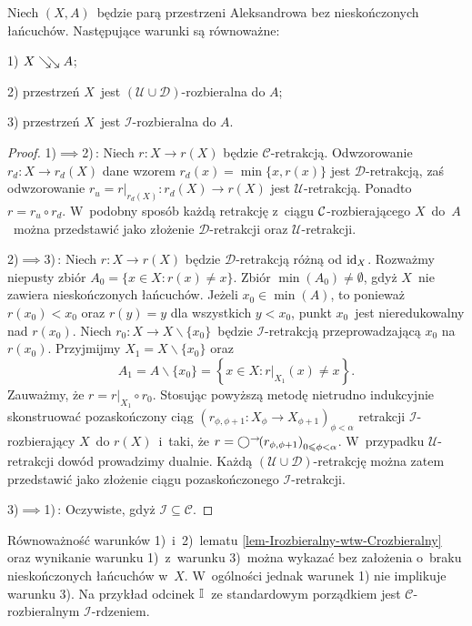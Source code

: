 \begin{lem}\label{lem-Irozbieralny-wtw-Crozbieralny}
Niech $(X,A)$~będzie parą przestrzeni Aleksandrowa bez nieskończonych łańcuchów. Następujące warunki są równoważne:
\begin{compactenum}
\item[1)] $X\searrow\!\!\searrow A$;
\item[2)] przestrzeń $X$~jest $(\mathcal{U}\cup\mathcal{D})$-rozbieralna do $A$;
\item[3)] przestrzeń $X$~jest $\mathcal{I}$-rozbieralna do $A$.
\end{compactenum}
\end{lem}
\begin{proof}
1)$\implies$2)\,: Niech $r\colon X\to r(X)$ będzie $\mathcal{C}$-retrakcją. Odwzorowanie $r_d\colon X\to r_d(X)$ dane wzorem $r_d(x)=\min\{x,r(x)\}$ jest $\mathcal{D}$-retrakcją, zaś odwzorowanie $r_u=r\big|_{r_d(X)}\colon r_d(X)\to r(X)$ jest $\mathcal{U}$-retrakcją. Ponadto $r=r_u\circ r_d$. W~podobny sposób każdą retrakcję z~ciągu $\mathcal{C}$-rozbierającego $X$~do~$A$~można przedstawić jako złożenie $\mathcal{D}$-retrakcji oraz $\mathcal{U}$-retrakcji.

2)$\implies$3)\,: Niech $r\colon X\to r(X)$ będzie $\mathcal{D}$-retrakcją różną od $\operatorname{id}_X$. Rozważmy niepusty zbiór $A_0=\{x\in X:r(x)\not=x\}$. Zbiór $\min(A_0)\not=\emptyset$, gdyż $X$~nie zawiera nieskończonych łańcuchów. Jeżeli $x_0\in\min(A)$, to ponieważ $r(x_0)<x_0$ oraz $r(y)=y$ dla wszystkich $y<x_0$, punkt $x_0$~jest nieredukowalny nad $r(x_0)$. Niech $r_0\colon X\to X\smallsetminus \{x_0\}$~będzie $\mathcal{I}$-retrakcją przeprowadzającą $x_0$ na $r(x_0)$. Przyjmijmy $X_1=X\smallsetminus \{x_0\}$ oraz \[A_1=A\smallsetminus\{x_0\}=\left\{x\in X:r\big|_{X_1}(x)\not=x\right\}.\] Zauważmy, że $r=r\big|_{X_1}\circ r_0$. Stosując powyższą metodę nietrudno indukcyjnie skonstruować pozaskończony ciąg $\left(r_{\phi,\phi+1}\colon X_\phi\to X_{\phi+1}\right)_{\phi<\alpha}$ retrakcji \mbox{$\mathcal{I}$-rozbierający} $X$~do $r(X)$~i~taki, że $r=\bigcirc^\rightarrow\!\!\left(r_{\phi,\phi+1}\right)_{0\leqslant\phi<\alpha}$. W~przypadku \mbox{$\mathcal{U}$-retrakcji} dowód prowadzimy dualnie. Każdą $(\mathcal{U}\cup\mathcal{D})$-retrakcję można zatem przedstawić jako złożenie ciągu pozaskończonego $\mathcal{I}$-retrakcji.

3)$\implies$1)\,: Oczywiste, gdyż $\mathcal{I}\subseteq\mathcal{C}$.
\end{proof}

Równoważność warunków 1)~i~2)~lematu \ref{lem-Irozbieralny-wtw-Crozbieralny} oraz wynikanie warunku 1)~z~warunku 3)~można wykazać bez założenia o~braku nieskończonych łańcuchów w~$X$. W~ogólności jednak warunek 1) nie implikuje warunku 3). Na przykład odcinek $\mathbb{I}$~ze standardowym porządkiem jest $\mathcal{C}$-rozbieralnym $\mathcal{I}$-rdzeniem.

